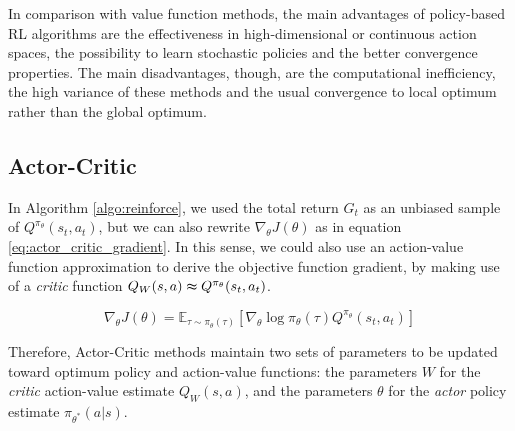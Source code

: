 In comparison with value function methods, the main advantages of policy-based RL algorithms are the effectiveness in high-dimensional or continuous action spaces, the possibility to learn stochastic policies and the better convergence properties. The main disadvantages, though, are the computational inefficiency, the high variance of these methods and the usual convergence to local optimum rather than the global optimum.


\subsection{Actor-Critic}

In Algorithm \ref{algo:reinforce}, we used the total return $G_t$ as an unbiased sample of $Q^{\pi_{\theta}}(s_t,a_t)$, but we can also rewrite $\nabla_{\theta} J(\theta)$ as in equation \ref{eq:actor_critic_gradient}. In this sense, we could also use an action-value function approximation to derive the objective function gradient, by making use of a \textit{critic} function $Q_W(s,a) \thickapprox Q^{\pi_{\theta}}(s_t,a_t)$.

\begin{equation}
\nabla_{\theta} J(\theta) = \mathbb{E}_{\tau \sim \pi_{\theta}(\tau)} \left[ \nabla_{\theta} \log{\pi_{\theta}(\tau)} Q^{\pi_{\theta}}(s_t,a_t) \right]
\label{eq:actor_critic_gradient}
\end{equation}

Therefore, Actor-Critic methods maintain two sets of parameters to be updated toward optimum policy and action-value functions: the parameters $W$ for the \textit{critic} action-value estimate $Q_W(s,a)$, and the parameters $\theta$ for the \textit{actor} policy estimate $\pi_{\theta^*}(a|s)$.

